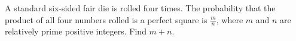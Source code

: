 A standard six-sided fair die is rolled four times. The probability that the product of all four numbers rolled is a perfect square is $\tfrac{m}{n}$, where $m$ and $n$ are relatively prime positive integers. Find $m+n$.